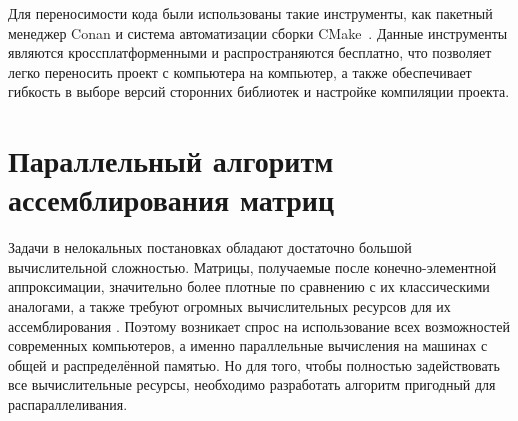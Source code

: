 Для переносимости кода были использованы такие инструменты, как пакетный менеджер Conan \cite{Conan} и система автоматизации сборки \mbox{CMake \cite{CMake}.} Данные инструменты являются кроссплатформенными и распространяются бесплатно, что позволяет легко переносить проект с компьютера на компьютер, а также обеспечивает гибкость в выборе версий сторонних библиотек и настройке компиляции \mbox{проекта.}

\section{Параллельный алгоритм ассемблирования матриц}\label{sec:ProgramComplex/ParallelAlgorithm}

Задачи в нелокальных постановках обладают достаточно большой вычислительной сложностью. Матрицы, получаемые после конечно-элементной аппроксимации, значительно более плотные по сравнению с их классическими аналогами, а также требуют огромных вычислительных ресурсов для их ассемблирования \cite{AMCSM2019}. Поэтому возникает спрос на использование всех возможностей современных компьютеров, а именно параллельные вычисления на машинах с общей и распределённой памятью. Но для того, чтобы полностью задействовать все вычислительные ресурсы, необходимо разработать алгоритм пригодный для распараллеливания.

